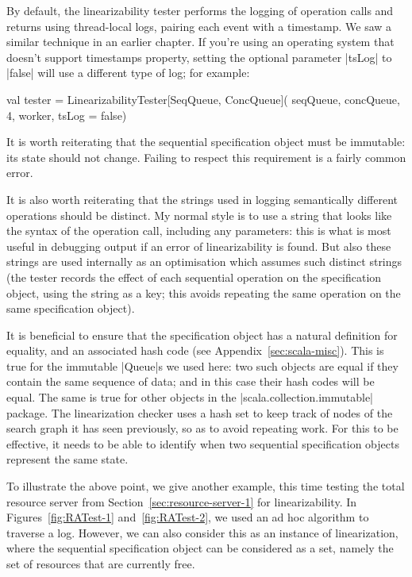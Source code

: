 By default, the linearizability tester performs the logging of operation calls
and returns using thread-local logs, pairing each event with a timestamp.  We
saw a similar technique in an earlier chapter.  If you're using an operating
system that doesn't support timestamps property, setting the optional
parameter |tsLog| to |false| will use a different type of log; for example:
%
\begin{scala}
  val tester = LinearizabilityTester[SeqQueue, ConcQueue](
    seqQueue, concQueue, 4, worker, tsLog = false)
\end{scala}

It is worth reiterating that the sequential specification object must be
immutable: its state should not change.  Failing to respect this requirement
is a fairly common error.

It is also worth reiterating that the strings used in logging semantically
different operations should be distinct.  My normal style is to use a string
that looks like the syntax of the operation call, including any parameters:
this is what is most useful in debugging output if an error of linearizability
is found.  But also these strings are used internally as an optimisation which
assumes such distinct strings (the tester records the effect of each
sequential operation on the specification object, using the string as a key;
this avoids repeating the same operation on the same specification object).

It is beneficial to ensure that the specification object has a natural
definition for equality, and an associated hash code (see
Appendix~\ref{sec:scala-misc}).  This is true for the immutable |Queue|s we
used here: two such objects are equal if they contain the same sequence of
data; and in this case their hash codes will be equal.  The same is true for
other objects in the |scala.collection.immutable| package.  The linearization
checker uses a hash set to keep track of nodes of the search graph it has seen
previously, so as to avoid repeating work.  For this to be effective, it needs
to be able to identify when two sequential specification objects represent the
same state.

To illustrate the above point, we give another example, this time testing the
total resource server from Section~\ref{sec:resource-server-1} for
linearizability.  In Figures~\ref{fig:RATest-1} and~\ref{fig:RATest-2}, we
used an ad hoc algorithm to traverse a log.  However, we can also consider
this as an instance of linearization, where the sequential specification
object can be considered as a set, namely the set of resources that are
currently free.


